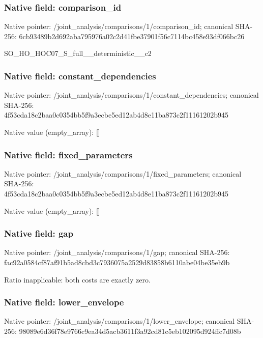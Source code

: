 \documentclass[10pt,a4paper]{article}
\begin{document}
\subsubsection{Native field: comparison\_\allowbreak{}id}
Native pointer: /joint\_\allowbreak{}analysis/comparisons/1/comparison\_\allowbreak{}id; canonical SHA-256: 6cb93489b2d692aba795976a02c2d41fbe37901f56c7114bc458e93df066bc26

\begingroup\raggedright\sloppy SO\_\allowbreak{}HO\_\allowbreak{}HOC07\_\allowbreak{}S\_\allowbreak{}full\_\allowbreak{}\_\allowbreak{}deterministic\_\allowbreak{}\_\allowbreak{}c2\par\endgroup

\subsubsection{Native field: constant\_\allowbreak{}dependencies}
Native pointer: /joint\_\allowbreak{}analysis/comparisons/1/constant\_\allowbreak{}dependencies; canonical SHA-256: 4f53cda18c2baa0c0354bb5f9a3ecbe5ed12ab4d8e11ba873c2f11161202b945

Native value (empty\_\allowbreak{}array): []

\subsubsection{Native field: fixed\_\allowbreak{}parameters}
Native pointer: /joint\_\allowbreak{}analysis/comparisons/1/fixed\_\allowbreak{}parameters; canonical SHA-256: 4f53cda18c2baa0c0354bb5f9a3ecbe5ed12ab4d8e11ba873c2f11161202b945

Native value (empty\_\allowbreak{}array): []

\subsubsection{Native field: gap}
Native pointer: /joint\_\allowbreak{}analysis/comparisons/1/gap; canonical SHA-256: fac92a0584cf87af91b5ad8cbd3c7936075a2529d83858b6110abe04be35eb9b

\begingroup\raggedright\sloppy Ratio inapplicable:\allowbreak{} both costs are exactly zero.\par\endgroup

\subsubsection{Native field: lower\_\allowbreak{}envelope}
Native pointer: /joint\_\allowbreak{}analysis/comparisons/1/lower\_\allowbreak{}envelope; canonical SHA-256: 98089e6d36f78e9766c9ea34d5acb3611f3a92cd81c5eb102095d924ffc7d08b
\end{document}
